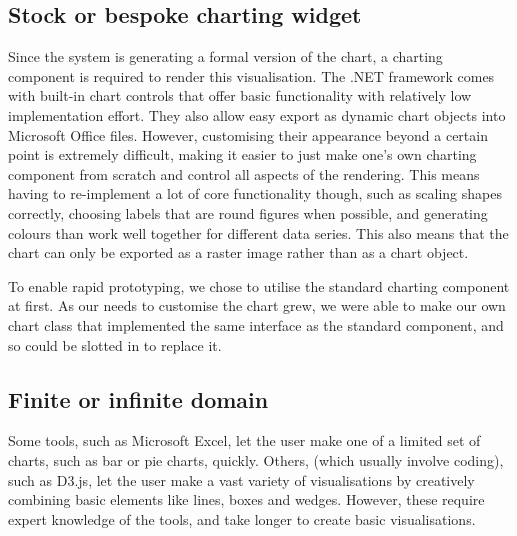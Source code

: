 	\subsection{Stock or bespoke charting widget}	
	Since the system is generating a formal version of the chart, a charting component is required to render this visualisation. The .NET framework comes with built-in chart controls that offer basic functionality with relatively low implementation effort. They also allow easy export as dynamic chart objects into Microsoft Office files. However, customising their appearance beyond a certain point is extremely difficult, making it easier to just make one's own charting component from scratch and control all aspects of the rendering. This means having to re-implement a lot of core functionality though, such as scaling shapes correctly, choosing labels that are round figures when possible, and generating colours than work well together for different data series. This also means that the chart can only be exported as a raster image rather than as a chart object.
	
	To enable rapid prototyping, we chose to utilise the standard charting component at first. As our needs to customise the chart grew, we were able to make our own chart class that implemented the same interface as the standard component, and so could be slotted in to replace it.
	
	\subsection{Finite or infinite domain}
	Some tools, such as Microsoft Excel, let the user make one of a limited set of charts, such as bar or pie charts, quickly. Others, (which usually involve coding), such as D3.js, let the user make a vast variety of visualisations by creatively combining basic elements like lines, boxes and wedges. However, these require expert knowledge of the tools, and take longer to create basic visualisations. 
	

